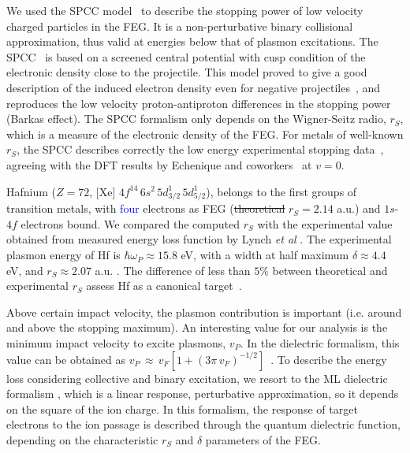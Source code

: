\documentclass[aps,pra,reprint,superscriptaddress]{revtex4-1}
\def\ale#1{\textcolor{blue}{#1}}
\begin{document}
We used the SPCC model~\cite{mon17} to describe the stopping power of 
low velocity charged particles in the FEG. It is a non-perturbative 
binary collisional approximation, thus valid at energies below that of 
plasmon excitations.  The SPCC~\cite{mon17} is based on a screened 
central potential with cusp condition of the electronic density close 
to the projectile. This model proved to give a good description of the 
induced electron density even for negative projectiles~\cite{mon17}, 
and reproduces the low velocity proton-antiproton differences in the 
stopping power (Barkas effect). The SPCC formalism only depends on the 
Wigner-Seitz radio, $r_S$, which is a measure of the electronic density 
of the FEG. For metals of well-known $r_S$, the SPCC describes correctly 
the low energy experimental stopping data~\cite{mon17}, agreeing with 
the DFT results by Echenique and coworkers~\cite{eche81,nagy89} at $v=0$. 

Hafnium ($Z=72$, [Xe] $4f^{14}\,6s^2\,5d_{3/2}^1\,5d_{5/2}^1$), belongs 
to the first groups of transition metals, with \ale{four} electrons as FEG 
(\st{theoretical} $r_S=2.14$ a.u.) and $1s$-$4f$ electrons bound. We compared 
the computed $r_S$ with the experimental value obtained from measured 
energy loss function by Lynch \textit{et al} \cite{lynch75}. The 
experimental plasmon energy of Hf is $\hbar\omega_P \approx 15.8$ eV, 
with a width at half maximum $\delta \approx 4.4$ eV, and 
$r_S \approx 2.07$ a.u. \cite{lynch75}. The difference of less than 
$5\%$ between theoretical and experimental $r_S$ assess Hf as a 
canonical target~\cite{mon17}.

Above certain impact velocity, the plasmon contribution is important 
(i.e. around and above the stopping maximum). An interesting value for 
our analysis is the minimum impact velocity to excite plasmons, $v_P$. 
In the dielectric formalism, this value can be obtained as 
$v_P\,\approx\,v_F[1+(3\pi\,v_F)^{-1/2}]$~\cite{suppression}. To 
describe the energy loss considering collective and binary excitation, 
we resort to the ML dielectric formalism \cite{Mermin}, which is a 
linear response, perturbative approximation, so it depends on the 
square of the ion charge. In this formalism, the response of target 
electrons to the ion passage is described through the quantum dielectric 
function, depending on the characteristic $r_S$ and $\delta$ parameters 
of the FEG. 
\end{document}

